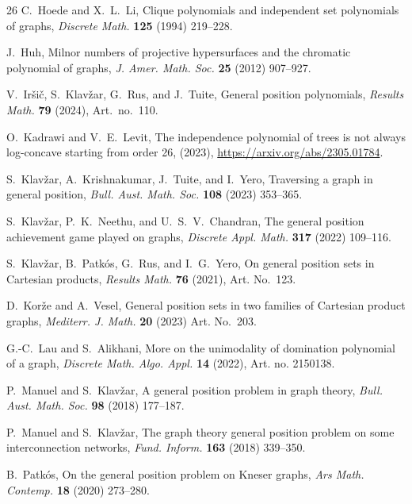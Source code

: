 \documentclass[12pt,twoside]{article}
\begin{document}
\begin{thebibliography}{26}
			C.~Hoede and X.~L.~Li,
			Clique polynomials and independent set polynomials of graphs,
			\emph{Discrete Math.} \textbf{125} (1994) 219--228.
			
			J.~Huh,
			Milnor numbers of projective hypersurfaces and the chromatic polynomial of graphs,
			\emph{J. Amer. Math. Soc.} \textbf{25} (2012) 907--927.
			
			V.~Ir\v{s}i\v{c}, S.~Klav\v{z}ar, G.~Rus, and J.~Tuite,
			General position polynomials,
			\emph{Results Math.} \textbf{79} (2024), Art.~no.~110.
			
			O.~Kadrawi and V.~E.~Levit,
			The independence polynomial of trees is not always log-concave starting from order 26, (2023), \url{https://arxiv.org/abs/2305.01784}.
			
			S.~Klav\v{z}ar, A.~Krishnakumar, J.~Tuite, and I.~Yero,
			Traversing a graph in general position,
			\emph{Bull. Aust. Math. Soc.} \textbf{108} (2023) 353--365.
			
			S.~Klav\v{z}ar, P.~K.~Neethu, and U.~S.~V.~Chandran,
			The general position achievement game played on graphs,
			\emph{Discrete Appl. Math.} \textbf{317} (2022) 109--116.
			
			S.~Klav\v{z}ar, B.~Patk\'os, G.~Rus, and I.~G.~Yero,
			On general position sets in Cartesian products,
			\emph{Results Math.} \textbf{76} (2021), Art. No.~123.
			
			D.~Kor\v{z}e and A.~Vesel,
			General position sets in two families of Cartesian product graphs,
			\emph{Mediterr. J. Math.} \textbf{20} (2023) Art. No.~203.
			
			G.-C.~Lau and S.~Alikhani,
			More on the unimodality of domination polynomial of a graph,
			\emph{Discrete Math. Algo. Appl.} \textbf{14} (2022), Art. no. 2150138.
			
			P.~Manuel and S.~Klav\v{z}ar,
			A general position problem in graph theory,
			\emph{Bull. Aust. Math. Soc.} \textbf{98} (2018) 177--187.
			
			P.~Manuel and S.~Klav\v{z}ar,
			The graph theory general position problem on some interconnection networks,
			\emph{Fund. Inform.} \textbf{163} (2018) 339--350.
			
			B.~Patk\'os,
			On the general position problem on Kneser graphs,
			\emph{Ars Math. Contemp.} \textbf{18} (2020) 273--280.
			

\end{thebibliography}
\end{document}
